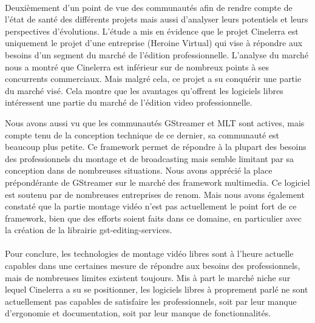 \paragraph{}

Deuxièmement d'un point de vue des communautés afin de rendre compte
de l'état de santé des différents projets mais aussi d'analyser leurs
potentiels et leurs perspectives d'évolutions.
L'étude a mis en évidence que le projet Cinelerra est
uniquement le projet d'une entreprise (Heroine Virtual) qui vise
à répondre aux besoins d'un segment du marché de l'édition
professionnelle. L'analyse du marché nous a montré que Cinelerra
est inférieur sur de nombreux points à ses concurrents commerciaux.
Mais malgré cela, ce projet a su conquérir une partie du marché
visé. Cela montre que les avantages qu'offrent les logiciels libres
intéressent une partie du marché de l'édition video professionnelle.

Nous avons aussi vu que les communautés GStreamer et MLT sont actives,
mais compte tenu de la conception technique de ce dernier, sa communauté
est beaucoup plus petite. Ce framework permet de répondre à la plupart
des besoins des professionnels du montage et de broadcasting mais semble
limitant par sa conception dans de nombreuses situations.  Nous avons
apprécié la place prépondérante de GStreamer sur le marché des
framework multimedia. Ce logiciel est soutenu par de nombreuses entreprises
de renom. Mais nous avons également constaté que la partie montage vidéo
n'est pas actuellement le point fort de ce framework, bien que des
efforts soient faits dans ce domaine, en particulier avec la création de
la librairie gst-editing-services.

\paragraph{}

Pour conclure, les technologies de montage vidéo libres sont à l'heure
actuelle capables dans une certaines mesure de répondre aux besoins des
professionnels, mais de nombreuses limites existent toujours. Mis à part
le marché niche sur lequel Cinelerra a su se positionner, les
logiciels libres à proprement parlé ne sont actuellement pas capables
de satisfaire les professionnels, soit par leur manque d'ergonomie et
documentation, soit par leur manque de fonctionnalités.

\paragraph{}

